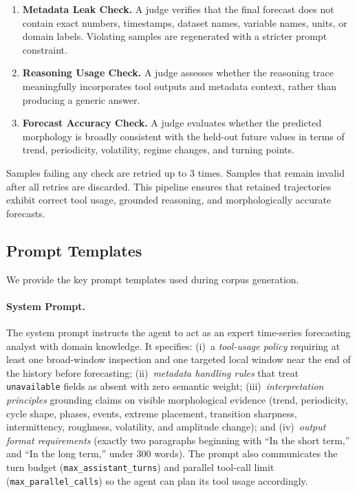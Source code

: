 \documentclass[11pt]{article}
\begin{document}
\begin{enumerate}
    \item \textbf{Metadata Leak Check.} A judge verifies that the final forecast does not contain exact numbers, timestamps, dataset names, variable names, units, or domain labels.
    Violating samples are regenerated with a stricter prompt constraint.

    \item \textbf{Reasoning Usage Check.} A judge assesses whether the reasoning trace meaningfully incorporates tool outputs and metadata context, rather than producing a generic answer.

    \item \textbf{Forecast Accuracy Check.} A judge evaluates whether the predicted morphology is broadly consistent with the held-out future values in terms of trend, periodicity, volatility, regime changes, and turning points.
\end{enumerate}

Samples failing any check are retried up to 3 times.
Samples that remain invalid after all retries are discarded.
This pipeline ensures that retained trajectories exhibit correct tool usage, grounded reasoning, and morphologically accurate forecasts.

\subsection{Prompt Templates}
\label{app:prompts}

We provide the key prompt templates used during corpus generation.

\paragraph{System Prompt.}
The system prompt instructs the agent to act as an expert time-series forecasting analyst with domain knowledge.
It specifies:
(i)~a \emph{tool-usage policy} requiring at least one broad-window inspection and one targeted local window near the end of the history before forecasting;
(ii)~\emph{metadata handling rules} that treat \texttt{unavailable} fields as absent with zero semantic weight;
(iii)~\emph{interpretation principles} grounding claims on visible morphological evidence (trend, periodicity, cycle shape, phases, events, extreme placement, transition sharpness, intermittency, roughness, volatility, and amplitude change);
and (iv)~\emph{output format requirements} (exactly two paragraphs beginning with ``In the short term,'' and ``In the long term,'' under 300 words).
The prompt also communicates the turn budget (\texttt{max\_assistant\_turns}) and parallel tool-call limit (\texttt{max\_parallel\_calls}) so the agent can plan its tool usage accordingly.
\end{document}
